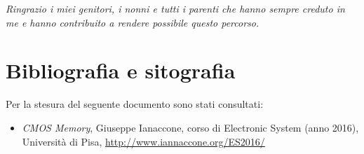\documentclass[10 pt,letterpaper,twoside,openright]{book}
\begin{document}
	\begin{flushright}
		\textit{Ringrazio i miei genitori, i nonni e tutti i parenti che hanno sempre creduto in me e hanno contribuito a rendere possibile questo percorso.}
	\end{flushright}

	
	\tableofcontents
	
	
	
	\mainmatter
	
	
	
	
	
	
	
	
	
	
	
	\backmatter
	
	
	\chapter{Bibliografia e sitografia}
	\printbibliography[heading=none]
	
	\noindent
	Per la stesura del seguente documento sono stati consultati:
	\begin{itemize}
		\item \textit{CMOS Memory}, Giuseppe Ianaccone, corso di Electronic System (anno 2016), Università di Pisa, \url{http://www.iannaccone.org/ES2016/}
	\end{itemize}
	
	
	
	
		
\end{document}

